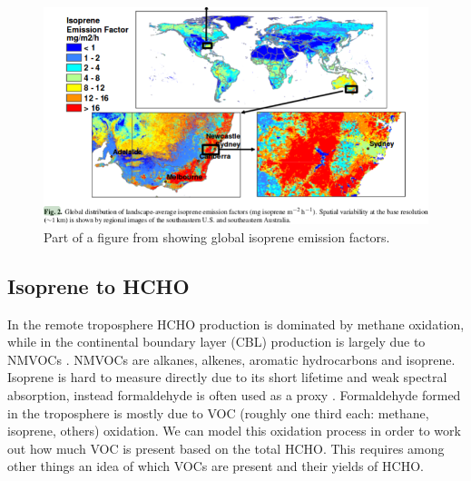     \begin{figure}
      \includegraphics{Figures/MeganIsoprene1.png}
      \caption{ Part of a figure from \citet{Guenther2006} showing global isoprene emission factors. }
      \label{ch_LitRev:fig:meganisoprene}
    \end{figure}
    
  \subsection{Isoprene to HCHO}
    \label{ch_LitRev:sec:IsopFromHCHO}
    In the remote troposphere HCHO production is dominated by methane oxidation, while in the continental boundary layer (CBL) production is largely due to NMVOCs \citep{Abbot2003, Kefauver2014}.
    NMVOCs are alkanes, alkenes, aromatic hydrocarbons and isoprene.
    Isoprene is hard to measure directly due to its short lifetime and weak spectral absorption, instead formaldehyde is often used as a proxy \citep{Millet2006, Fu2007, Dufour2009, Marais2012, bauwens2013satellite, Kefauver2014, Bauwens2016}.
    Formaldehyde formed in the troposphere is mostly due to VOC (roughly one third each: methane, isoprene, others) oxidation.
    We can model this oxidation process in order to work out how much VOC is present based on the total HCHO.
    This requires among other things an idea of which VOCs are present and their yields of HCHO.
    
